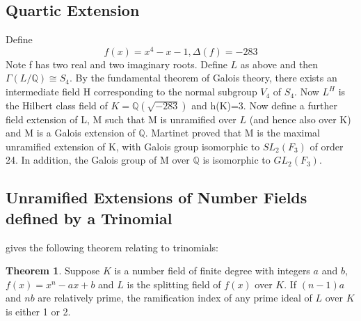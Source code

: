 \documentclass[12pt]{extarticle}
\newcommand{\<}{\langle}
\renewcommand{\>}{\rangle}
\theoremstyle{definition}
\newtheorem{theorem}{Theorem}
\begin{document}
\subsection{Quartic Extension}
Define  \begin{equation}
    f(x)=x^4-x-1, \Delta(f)=-283
\end{equation}
Note f has two real and two imaginary roots. Define $L$ as above and then $\Gamma(L/\mathbb{Q})\cong S_4$. By the fundamental theorem of Galois theory, there exists an intermediate field H corresponding to the normal subgroup $V_4$ of $S_4$. Now $L^H$ is the Hilbert class field of $K= \mathbb{Q}(\sqrt{-283})$ and h(K)=3. Now define a further field extension of L, M such that M is unramified over $L$ (and hence also over K) and M is a Galois extension of $\mathbb{Q}$. Martinet proved that M is the maximal unramified extension of K, with Galois group isomorphic to $SL_2(F_3)$ of order 24. In addition, the Galois group of M over $\mathbb{Q}$ is isomorphic to $GL_2(F_3)$. 
\begin{center}
\end{center}
\subsection{Unramified Extensions of Number Fields defined by a Trinomial}
\cite{uchida1970} gives the following theorem relating to trinomials:
\begin{theorem}
Suppose $K$ is a number field of finite degree with integers $a$ and $b$, $f(x) = x^n-ax+b$ and $L$ is the splitting field of $f(x)$ over $K$. If $(n-1)a$ and $nb$ are relatively prime, the ramification index of any prime ideal of $L$ over $K$ is either 1 or 2. 
\end{theorem}
\end{document}
